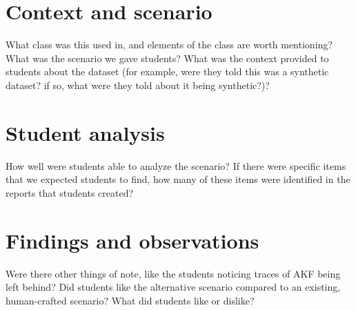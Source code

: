 \section{Context and scenario}\label{context-and-scenario}

What class was this used in, and elements of the class are worth
mentioning? What was the scenario we gave students? What was the context
provided to students about the dataset (for example, were they told this
was a synthetic dataset? if so, what were they told about it being
synthetic?)?

\section{Student analysis}\label{student-analysis}

How well were students able to analyze the scenario? If there were
specific items that we expected students to find, how many of these
items were identified in the reports that students created?

\section{Findings and
observations}\label{findings-and-observations}

Were there other things of note, like the students noticing traces of
AKF being left behind? Did students like the alternative scenario
compared to an existing, human-crafted scenario? What did students like
or dislike?
